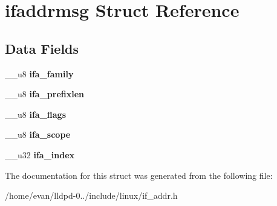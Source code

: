 \section{ifaddrmsg \-Struct \-Reference}
\label{structifaddrmsg}
\subsection*{\-Data \-Fields}
\begin{DoxyCompactItemize}
\item 
\-\_\-\-\_\-u8 {\bfseries ifa\-\_\-family}\label{structifaddrmsg_a200c9fb1f0a216fa6fad73f17360d3ce}

\item 
\-\_\-\-\_\-u8 {\bfseries ifa\-\_\-prefixlen}\label{structifaddrmsg_af4530350295e79f413bb5d487ec891fc}

\item 
\-\_\-\-\_\-u8 {\bfseries ifa\-\_\-flags}\label{structifaddrmsg_af287685450085ce20fd0cf71b61f2975}

\item 
\-\_\-\-\_\-u8 {\bfseries ifa\-\_\-scope}\label{structifaddrmsg_a8b60fbba6d76879ce11b691a7a6ca9c1}

\item 
\-\_\-\-\_\-u32 {\bfseries ifa\-\_\-index}\label{structifaddrmsg_a0859f6fbee2ab69d5b654ec2a540ce39}

\end{DoxyCompactItemize}


\-The documentation for this struct was generated from the following file\-:\begin{DoxyCompactItemize}
\item 
/home/evan/lldpd-\/0../include/linux/if\-\_\-addr.\-h\end{DoxyCompactItemize}
